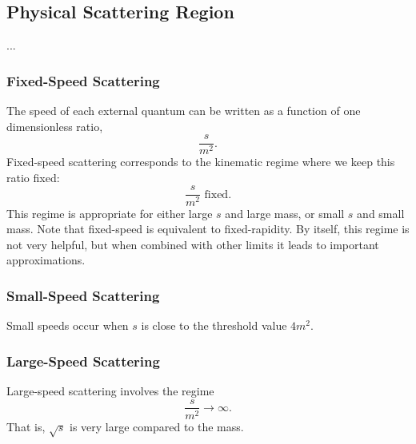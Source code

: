 \subsection{Physical Scattering Region}
...
\subsubsection{Fixed-Speed Scattering}
The speed of each external quantum can be written as a function of one dimensionless ratio,
\begin{equation}
	\frac{s}{m^{2}}.
\end{equation}
Fixed-speed scattering corresponds to the kinematic regime where we keep this ratio fixed:
\begin{equation}
	\frac{s}{m^{2}} \text{ fixed}.
\end{equation}
This regime is appropriate for either large $s$ and large mass, or small $s$ and small mass. Note that fixed-speed is equivalent to fixed-rapidity. By itself, this regime is not very helpful, but when combined with other limits it leads to important approximations.
\subsubsection{Small-Speed Scattering}
Small speeds occur when $s$ is close to the threshold value $4 m^{2}$.
\subsubsection{Large-Speed Scattering}
Large-speed scattering involves the regime
\begin{equation}
	\frac{s}{m^{2}} \rightarrow \infty.
\end{equation}
That is, $\sqrt{s}$ is very large compared to the mass.
